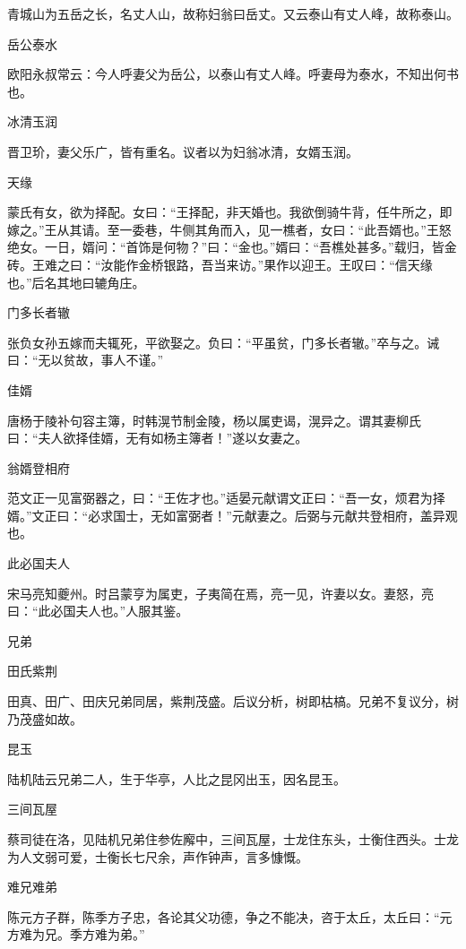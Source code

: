 \documentclass[a4paper,12pt,UTF8,twoside]{ctexbook}
\begin{document}
    青城山为五岳之长，名丈人山，故称妇翁曰岳丈。又云泰山有丈人峰，故称泰山。
    
    岳公泰水
    
    欧阳永叔常云：今人呼妻父为岳公，以泰山有丈人峰。呼妻母为泰水，不知出何书也。
    
    冰清玉润
    
    晋卫玠，妻父乐广，皆有重名。议者以为妇翁冰清，女婿玉润。
    
    天缘
    
    蒙氏有女，欲为择配。女曰：“王择配，非天婚也。我欲倒骑牛背，任牛所之，即嫁之。”王从其请。至一委巷，牛侧其角而入，见一樵者，女曰：“此吾婿也。”王怒绝女。一日，婿问：“首饰是何物？”曰：“金也。”婿曰：“吾樵处甚多。”载归，皆金砖。王难之曰：“汝能作金桥银路，吾当来访。”果作以迎王。王叹曰：“信天缘也。”后名其地曰辘角庄。
    
    门多长者辙
    
    张负女孙五嫁而夫辄死，平欲娶之。负曰：“平虽贫，门多长者辙。”卒与之。诫曰：“无以贫故，事人不谨。”
    
    佳婿
    
    唐杨于陵补句容主簿，时韩滉节制金陵，杨以属吏谒，滉异之。谓其妻柳氏曰：“夫人欲择佳婿，无有如杨主簿者！”遂以女妻之。
    
    翁婿登相府
    
    范文正一见富弼器之，曰：“王佐才也。”适晏元献谓文正曰：“吾一女，烦君为择婿。”文正曰：“必求国士，无如富弼者！”元献妻之。后弼与元献共登相府，盖异观也。
    
    此必国夫人
    
    宋马亮知夔州。时吕蒙亨为属吏，子夷简在焉，亮一见，许妻以女。妻怒，亮曰：“此必国夫人也。”人服其鉴。
    
    兄弟
    
    田氏紫荆
    
    田真、田广、田庆兄弟同居，紫荆茂盛。后议分析，树即枯槁。兄弟不复议分，树乃茂盛如故。
    
    昆玉
    
    陆机陆云兄弟二人，生于华亭，人比之昆冈出玉，因名昆玉。
    
    三间瓦屋
    
    蔡司徒在洛，见陆机兄弟住参佐廨中，三间瓦屋，士龙住东头，士衡住西头。士龙为人文弱可爱，士衡长七尺余，声作钟声，言多慷慨。
    
    难兄难弟
    
    陈元方子群，陈季方子忠，各论其父功德，争之不能决，咨于太丘，太丘曰：“元方难为兄。季方难为弟。”
    
\end{document}

